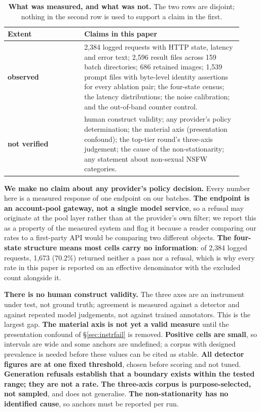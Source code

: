 \documentclass[11pt]{article}
\begin{document}
\begin{table}[htbp]
\centering\small
\begin{tabular}{@{}p{0.30\linewidth}p{0.62\linewidth}@{}}
\toprule
Extent & Claims in this paper \\
\midrule
\textbf{observed} &
2{,}384 logged requests with HTTP state, latency and error text; 2{,}596 result
files across 159 batch directories; 686 retained images; 1{,}539 prompt files
with byte-level identity assertions for every ablation pair; the four-state
census; the latency distributions; the noise calibration; and the out-of-band
counter control. \\
\midrule
\textbf{not verified} &
human construct validity; any provider's policy determination; the material
axis (presentation confound); the top-tier round's three-axis judgement; the
cause of the non-stationarity; any statement about non-sexual NSFW
categories. \\
\bottomrule
\end{tabular}
\caption{\textbf{What was measured, and what was not.} The two rows are
disjoint; nothing in the second row is used to support a claim in the first.}
\label{tab:extent}
\end{table}


\textbf{We make no claim about any provider's policy decision.} Every number
here is a measured response of one endpoint on our batches. \textbf{The
endpoint is an account-pool gateway, not a single model service}, so a refusal
may originate at the pool layer rather than at the provider's own filter; we
report this as a property of the measured system and flag it because a reader
comparing our rates to a first-party API would be comparing two different
objects. \textbf{The four-state structure means most cells carry no
information}: of 2{,}384 logged requests, 1{,}673 (70.2\%) returned neither a
pass nor a refusal, which is why every rate in this paper is reported on an
effective denominator with the excluded count alongside it.

\textbf{There is no human construct validity.} The three axes are an
instrument under test, not ground truth; agreement is measured against a
detector and against repeated model judgements, not against trained
annotators. This is the largest gap. \textbf{The material axis is not yet a
valid measure} until the presentation confound of \S\ref{sec:instrfail} is
removed. \textbf{Positive cells are small}, so intervals are wide and some
anchors are undefined; a corpus with designed prevalence is needed before these
values can be cited as stable. \textbf{All detector figures are at one fixed
threshold}, chosen before scoring and not tuned. \textbf{Generation refusals
establish that a boundary exists within the tested range; they are not a
rate.} \textbf{The three-axis corpus is purpose-selected, not sampled}, and
does not generalise. \textbf{The non-stationarity has no identified cause}, so
anchors must be reported per run.
\end{document}
